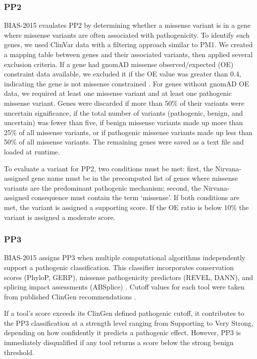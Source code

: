 \documentclass[unnumsec,webpdf,contemporary,large]{oup-authoring-template}
\theoremstyle{thmstyleone}
\theoremstyle{thmstyletwo}
\theoremstyle{thmstylethree}
\begin{document}
\subsubsection{PP2}
BIAS-2015 evaulates PP2 by determining whether a missense variant is in a gene where missense variants are often associated with pathogenicity. To identify such genes, we used ClinVar data with a filtering approach similar to PM1. We created a mapping table between genes and their associated variants, then applied several exclusion criteria. If a gene had gnomAD missense observed/expected (OE) constraint data available, we excluded it if the OE value was greater than 0.4, indicating the gene is not missense constrained \cite{karczewski2020mutational}. For genes without gnomAD OE data, we required at least one missense variant and at least one pathogenic missense variant. Genes were discarded if more than 50\% of their variants were uncertain significance, if the total number of variants (pathogenic, benign, and uncertain) was fewer than five, if benign missense variants made up more than 25\% of all missense variants, or if pathogenic missense variants made up less than 50\% of all missense variants. The remaining genes were saved as a text file and loaded at runtime.

To evaluate a variant for PP2, two conditions must be met: first, the Nirvana-assigned gene name must be in the precomputed list of genes where missense variants are the predominant pathogenic mechanism; second, the Nirvana-assigned consequence must contain the term ‘missense’. If both conditions are met, the variant is assigned a supporting score. If the OE ratio is below 10\% the variant is assigned a moderate score. 

\subsubsection{PP3}
BIAS-2015 assigns PP3 when multiple computational algorithms independently support a pathogenic classification. This classifier incorporates conservation scores (PhyloP, GERP), missense pathogenicity predictors (REVEL, DANN), and splicing impact assessments (ABSplice) \cite{pollard2010phyloP, ioannidis2016revel, quang2015dann, davydov2010gerp, wagner2023absplice}. Cutoff values for each tool were taken from published ClinGen recommendations \cite{pejaver2022pp3bp4}.

If a tool’s score exceeds its ClinGen defined pathogenic cutoff, it contributes to the PP3 classification at a strength level ranging from Supporting to Very Strong, depending on how confidently it predicts a pathogenic effect. However, PP3 is immediately disqualified if any tool returns a score below the strong benign threshold.
\end{document}
